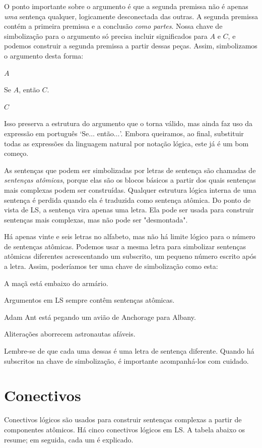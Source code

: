 O ponto importante sobre o argumento é que a segunda premissa não é apenas \emph{uma} sentença qualquer, logicamente desconectada das outras. A segunda premissa contém a primeira premissa e a conclusão \emph{como partes}. Nossa chave de simbolização para o argumento só precisa incluir significados para $A$ e $C$, e podemos construir a segunda premissa a partir dessas peças. Assim, simbolizamos o argumento desta forma:
\begin{earg}
\item[] $A$
\item[] Se $A$, então $C$.
\item[\therefore] $C$
\end{earg}
Isso preserva a estrutura do argumento que o torna válido, mas ainda faz uso da expressão em português `Se$\ldots$ então$\ldots$'. Embora queiramos, ao final, substituir todas as expressões da linguagem natural por notação lógica, este já é um bom começo.

As sentenças que podem ser simbolizadas por letras de sentença são chamadas de \emph{sentenças atômicas}, porque elas são os blocos básicos a partir dos quais sentenças mais complexas podem ser construídas. Qualquer estrutura lógica interna de uma sentença é perdida quando ela é traduzida como sentença atômica. Do ponto de vista de LS, a sentença vira apenas uma letra. Ela pode ser usada para construir sentenças mais complexas, mas não pode ser "desmontada".

Há apenas vinte e seis letras no alfabeto, mas não há limite lógico para o número de sentenças atômicas. Podemos usar a mesma letra para simbolizar sentenças atômicas diferentes acrescentando um subscrito, um pequeno número escrito após a letra. Assim, poderíamos ter uma chave de simbolização como esta:
\begin{ekey}
\item[A$_1$:] A maçã está embaixo do armário.
\item[A$_2$:] Argumentos em LS sempre contêm sentenças atômicas.
\item[A$_3$:] Adam Ant está pegando um avião de Anchorage para Albany.
\item[$\vdots$]
\item[A$_{294}$:] Aliterações aborrecem astronautas afáveis.
\end{ekey}
Lembre-se de que cada uma dessas é uma letra de sentença diferente. Quando há subscritos na chave de simbolização, é importante acompanhá-los com cuidado.


\section{Conectivos}
Conectivos lógicos são usados para construir sentenças complexas a partir de componentes atômicos. Há cinco conectivos lógicos em LS. A tabela abaixo os resume; em seguida, cada um é explicado.

